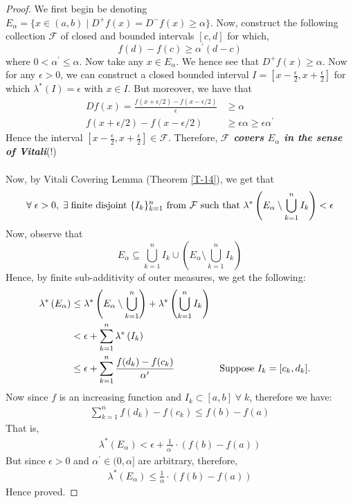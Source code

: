 \documentclass{article}
\theoremstyle{definition}
\theoremstyle{remark}
\theoremstyle{definition}
\theoremstyle{definition}
\theoremstyle{definition}
\newcommand{\union}{\cup}
\newcommand{\bunion}{\bigcup}
\newcommand{\where}{\;\vert\;}
\newcommand{\lom}[1]{\lambda^*\left (#1\right )}
\begin{document}
\begin{proof}
	We first begin be denoting $ E_\alpha = \{x\in (a,b)\where D^{+}f(x) = D^{-}f(x) \ge\alpha\} $. Now, construct the following collection $ \mathcal{F} $ of closed and bounded intervals $ [c,d] $ for which,
	\[f(d)-f(c) \ge \alpha^{\prime}(d-c)\]
	where $ 0 < \alpha^{\prime} \le \alpha $. Now take any $ x\in E_\alpha $. We hence see that $ D^{+}f(x) \ge \alpha $. Now for any $ \epsilon > 0 $, we can construct a closed bounded interval $ I = \left [x-\frac{\epsilon}{2}, x+ \frac{\epsilon}{2}\right ] $ for which $ \lom{I} = \epsilon $ with $ x\in I $. But moreover, we have that 
	\begin{align*}
		Df(x) = \frac{f(x+\epsilon/2) - f(x-\epsilon/2)}{\epsilon} &\ge \alpha \\
	f(x+ \epsilon/2) - f(x-\epsilon /2) &\ge \epsilon\alpha \ge \epsilon \alpha^{\prime}
	\end{align*}
Hence the interval $ \left [x-\frac{\epsilon}{2}, x+\frac{\epsilon}{2}\right ] \in \mathcal{F}$. Therefore, \textbf{\emph{$ \mathcal{F} $ covers $ E_\alpha $ in the sense of Vitali}}(!)\\\\
Now, by Vitali Covering Lemma (Theorem \ref{T-14}), we get that 
\[\forall\;\epsilon>0,\;\exists\;\text{finite disjoint }\{I_k\}_{k=1}^{n} \text{ from $ \mathcal{F} $ such that }\lom{E_\alpha \setminus \bunion_{k=1}^{n} I_k} < \epsilon\]
Now, observe that
\[E_\alpha \subseteq \bunion_{k=1}^{n}I_k \union \left (E_\alpha \setminus \bunion_{k=1}^{n} I_k\right )\]
Hence, by finite sub-additivity of outer measures, we get the following:
\begin{align*}
	\lom{E_\alpha} &\le \lom{E_\alpha \setminus \bunion_{k=1}^{n}} + \lom{\bunion_{k=1}^{n} I_k}\\
	&< \epsilon + \sum_{k=1}^{n} \lom{I_k}\\
	&\le \epsilon + \sum_{k=1}^{n} \frac{f(d_k) - f(c_k)}{\alpha^{\prime}}&&\text{Suppose $ I_k = [c_k,d_k] $.}
\end{align*}
Now since $ f $ is an increasing function and $ I_k \subset [a,b] \;\forall \;k$, therefore we have:
\begin{align*}
	\sum_{k=1}^{n} f(d_k) - f(c_k) \le f(b) - f(a)
\end{align*} 
That is,
\begin{align*}
	\lom{E_\alpha} < \epsilon + \frac{1}{\alpha^{\prime}} \cdot \left (f(b) - f(a)\right )
\end{align*}
But since $ \epsilon > 0 $ and $ \alpha^{\prime}\in (0,\alpha] $ are arbitrary, therefore,
\begin{align*}
	\lom{E_\alpha} \le \frac{1}{\alpha} \cdot \left (f(b) - f(a)\right )
\end{align*}
Hence proved.
\end{proof}
\newpage
\end{document}
